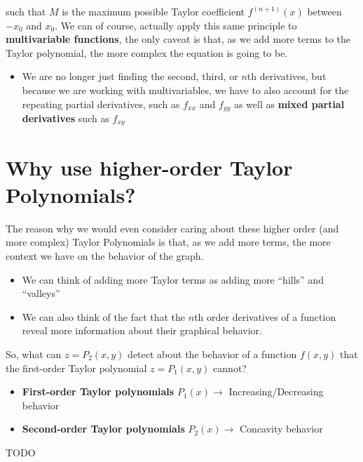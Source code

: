 \documentclass{report}
\begin{document}
\begin{sloppypar}
{\begin{equation}
  \end{equation}}
such that $ M $ is the maximum possible Taylor
coefficient $ f^{(n+1)}(x) $ between $ -x_{0} $ and
$ x_{0}$.
We can of course, actually apply this same
principle to \textbf{multivariable functions}, the
only caveat is that, as we add more terms to the
Taylor polynomial, the more complex the
equation is going to be.
\begin{itemize}
  \item We are no longer just finding the
        second, third, or $n$th derivatives,
        but because we are working with multivariables,
        we have to also account for the repeating
        partial derivatives, such as $ f_{xx} $ and
        $ f_{yy}$ as well as \textbf{mixed partial
        derivatives} such as $ f_{xy}$
\end{itemize}

\section{Why use higher-order Taylor Polynomials?}
The reason why we would even consider caring
about these higher order (and more complex)
Taylor Polynomials is that, as we add more terms,
the more context we have on the behavior of the graph.
\begin{itemize}
  \item We can think of adding more Taylor terms
        as adding more ``hills'' and ``valleys''
  \item We can also think of the fact that
        the $n$th order derivatives of a function
        reveal more information about their
        graphical behavior.
\end{itemize}
So, what can $ z = P_{2}(x,y)$ detect about
the behavior of a function $ f(x,y)$ that the
first-order Taylor polynomial $ z = P_{1}(x,y)$ cannot?
\begin{itemize}
  \item \textbf{First-order Taylor polynomials} $P_{1}(x) \rightarrow$ Increasing/Decreasing behavior
  \item \textbf{Second-order Taylor polynomials} $P_{2}(x) \rightarrow$ Concavity behavior
\end{itemize}
\sol TODO

\end{sloppypar}
\end{document}
